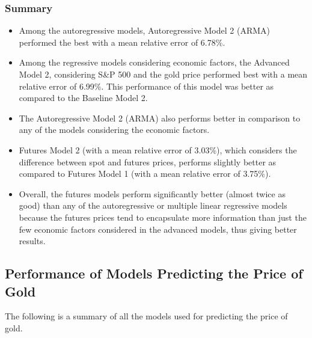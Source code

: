 \documentclass[runningheads]{llncs}
\begin{document}
\subsubsection{Summary}

\begin {itemize}

\item Among the autoregressive models, Autoregressive Model 2 (ARMA) performed the best with a mean relative error of 6.78\%. \\

\item Among the regressive models considering economic factors, the Advanced Model 2, considering S\&P 500 and the gold price performed best with a mean relative error of 6.99\%. This performance of this model was better as compared to the Baseline Model 2. \\

\item The Autoregressive Model 2 (ARMA) also performs better in comparison to any of the models considering the economic factors.\\

\item Futures Model 2 (with a mean relative error of 3.03\%), which considers the difference between spot and futures prices, performs slightly better as compared to Futures Model 1 (with a mean relative error of 3.75\%).\\

\item Overall, the futures models perform significantly better (almost twice as good) than any of the autoregressive or multiple linear regressive models because the futures prices tend to encapsulate more information than just the few economic factors considered in the advanced models, thus giving better results. \\

\end {itemize}

\subsection{Performance of Models Predicting the Price of Gold}

\noindent The following is a summary of all the models used for predicting the price of gold. \\
 
\end{document}
